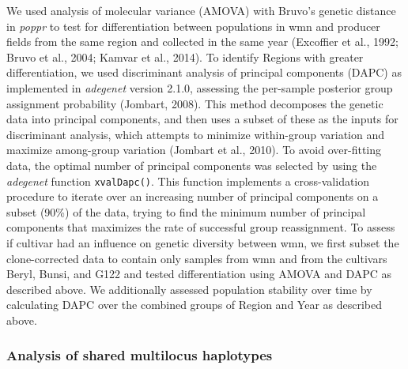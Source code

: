 We used analysis of molecular variance (AMOVA) with Bruvo's genetic
distance in \emph{poppr} to test for differentiation between populations
in wmn and producer fields from the same region and collected in the
same year (Excoffier et al., 1992; Bruvo et al., 2004; Kamvar et al.,
2014). To identify Regions with greater differentiation, we used
discriminant analysis of principal components (DAPC) as implemented in
\emph{adegenet} version 2.1.0, assessing the per-sample posterior group
assignment probability (Jombart, 2008). This method decomposes the
genetic data into principal components, and then uses a subset of these
as the inputs for discriminant analysis, which attempts to minimize
within-group variation and maximize among-group variation (Jombart et
al., 2010). To avoid over-fitting data, the optimal number of principal
components was selected by using the \emph{adegenet} function
\texttt{xvalDapc()}. This function implements a cross-validation
procedure to iterate over an increasing number of principal components
on a subset (90\%) of the data, trying to find the minimum number of
principal components that maximizes the rate of successful group
reassignment. To assess if cultivar had an influence on genetic
diversity between wmn, we first subset the clone-corrected data to
contain only samples from wmn and from the cultivars Beryl, Bunsi, and
G122 and tested differentiation using AMOVA and DAPC as described above.
We additionally assessed population stability over time by calculating
DAPC over the combined groups of Region and Year as described above.

\subsubsection*{Analysis of shared multilocus
haplotypes}\label{analysis-of-shared-multilocus-haplotypes}

